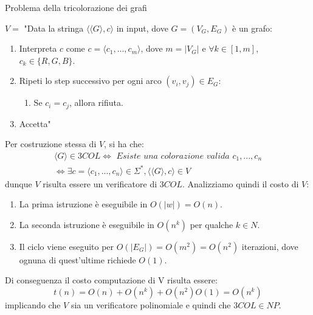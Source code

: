 \begin{Example}{Problema della tricolorazione dei grafi}{}
\begin{demonstration}
$V =$ "Data la stringa $\langle \langle G\rangle, c\rangle$ in input, dove $G = (V_G, E_G)$ è un grafo:
\begin{enumerate}
    \item Interpreta $c$ come $c = \langle c_1,...,c_m\rangle$, dove $m = |V_G|$ e $\forall k \in [1, m]$, $c_k \in \{R, G, B\}$.
    \item Ripeti lo step successivo per ogni arco $(v_i, v_j) \in E_G$:
    \begin{enumerate}
        \item Se $c_i = c_j$, allora rifiuta.
    \end{enumerate}
    \item Accetta"
\end{enumerate}
Per costruzione stessa di $V$, si ha che:
\begin{align*}
\langle G\rangle \in 3COL \iff\textit{ Esiste una colorazione valida }c_1,...,c_n\\\iff \exists c = \langle c_1,...,c_n\rangle \in \Sigma^*,\langle \langle G\rangle, c\rangle \in V
\end{align*}
dunque $V$ risulta essere un verificatore di $3COL$. Analizziamo quindi il costo di $V$:
\begin{enumerate}
    \item La prima istruzione è eseguibile in $O(|w|) = O(n)$.
    \item La seconda istruzione è eseguibile in $O(n^k)$ per qualche $k \in N$.
    \item Il ciclo viene eseguito per $O(|E_G|) = O(m^2) = O(n^2)$ iterazioni, dove ognuna di quest’ultime richiede $O(1)$.
\end{enumerate}
Di conseguenza il costo computazione di V risulta essere:
\begin{equation*}
    t(n) = O(n) + O(n^k) + O(n^2)O(1) = O(n^k)
\end{equation*}
implicando che $V$ sia un verificatore polinomiale e quindi che $3COL \in NP$.
\end{demonstration}
\end{Example}

